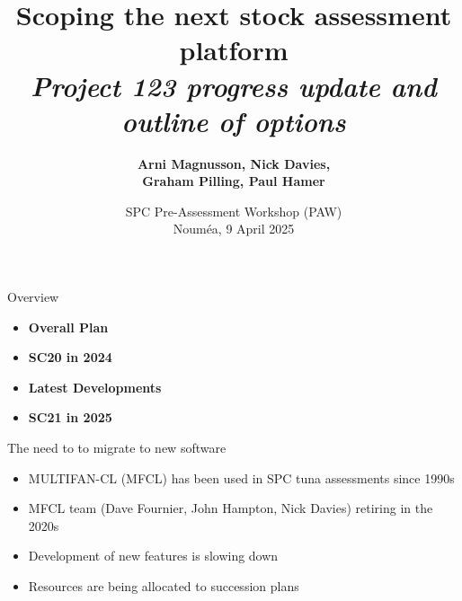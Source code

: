 \documentclass[aspectratio=169,fleqn]{beamer}
\begin{document}
\begin{frame}
  \title{\vspace{-5ex}\darkblue Scoping the next stock assessment
    platform\\[2ex]
    \it\large\darkgray
    Project 123 progress update and outline of options}
  \author{\vspace{-10ex}\darkgray\bf
    Arni Magnusson, Nick Davies,\\[0.5ex]
    Graham Pilling, Paul Hamer}
  \date{\darkgreen SPC Pre-Assessment Workshop (PAW)\\[0.5ex]
    Nouméa, 9 April 2025}
  \titlepage
\end{frame}


\begin{frame}{Overview}
  \begin{itemize}
    \item[] {\bf\darkblue Overall Plan} \\[5ex]
    \item[] {\bf\darkblue SC20 in 2024} \\[5ex]
    \item[] {\bf\darkblue Latest Developments} \\[5ex]
    \item[] {\bf\darkblue SC21 in 2025} \\[1ex]
  \end{itemize}
\end{frame}


\begin{frame}{The need to to migrate to new software}
  \begin{itemize}
    \item[] MULTIFAN-CL (MFCL) has been used in SPC tuna assessments since
    1990s\\[4ex]
    \item[] MFCL team (Dave Fournier, John Hampton, Nick Davies) retiring in the
    2020s\\[4ex]
    \item[] Development of new features is slowing down\\[4ex]
    \item[] Resources are being allocated to succession plans\\[2ex]
  \end{itemize}
\end{frame}
\end{document}
